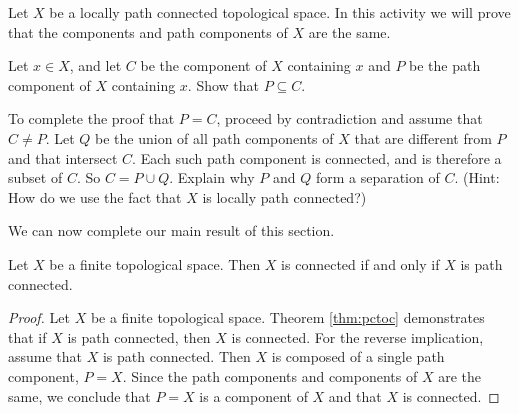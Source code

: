 \begin{activity} Let $X$ be a locally path connected topological space. In this activity we will prove that the components and path components of $X$ are the same.
\ba
\item Let $x \in X$, and let $C$ be the component of $X$ containing $x$ and $P$ be the path component of $X$ containing $x$. Show that $P \subseteq C$. 

\item To complete the proof that $P = C$, proceed by contradiction and assume that $C \neq P$. Let $Q$ be the union of all path components of $X$ that are different from $P$ and that intersect $C$. Each such path component is connected, and is therefore a subset of $C$. So $C = P \cup Q$. Explain why $P$ and $Q$ form a separation of $C$. (Hint: How do we use the fact that $X$ is locally path connected?)

\ea

\end{activity}


\begin{comment}

\ActivitySolution

\ba
\item Since $P$ is path connected, Theorem \ref{thm:pctoc} shows that $P$ is connected. The fact that $C$ is the largest connected subset of $X$ containing $x$ implies that $P \subseteq C$.  

\item  Lemma \ref{lem:open_PC} shows that $P$ is an open set, and that $Q$ is an open set. Since path components are either equal or disjoint, we have that $P \cap Q = \emptyset$. Therefore, if $C \neq P$, then $P$ and $Q$ form a separation of $C$. This contradicts the fact that $C$ is connected. We conclude that $C = P$ and that the components and path components of $X$ are the same. 

\ea

\end{comment}

We can now complete our main result of this section.

\begin{theorem} Let $X$ be a finite topological space. Then $X$ is connected if and only if $X$ is path connected. 
\end{theorem}

\begin{proof} Let $X$ be a finite topological space. Theorem \ref{thm:pctoc} demonstrates that if $X$ is path connected, then $X$ is connected. For the reverse implication, assume that $X$ is path connected. Then $X$ is composed of a single path component, $P=X$. Since the path components and components of $X$ are the same, we conclude that $P= X$ is a component of $X$ and that $X$ is connected. 
\end{proof}


